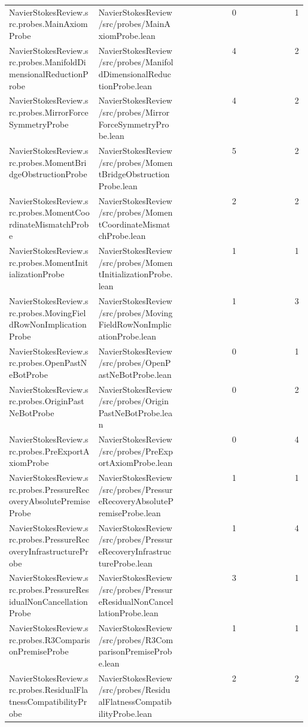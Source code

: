 \begin{longtable}{p{0.30\linewidth}p{0.28\linewidth}rr}
NavierStokesReview.src.probes.MainAxiomProbe & NavierStokesReview/src/probes/MainAxiomProbe.lean & 0 & 1\\
NavierStokesReview.src.probes.ManifoldDimensionalReductionProbe & NavierStokesReview/src/probes/ManifoldDimensionalReductionProbe.lean & 4 & 2\\
NavierStokesReview.src.probes.MirrorForceSymmetryProbe & NavierStokesReview/src/probes/MirrorForceSymmetryProbe.lean & 4 & 2\\
NavierStokesReview.src.probes.MomentBridgeObstructionProbe & NavierStokesReview/src/probes/MomentBridgeObstructionProbe.lean & 5 & 2\\
NavierStokesReview.src.probes.MomentCoordinateMismatchProbe & NavierStokesReview/src/probes/MomentCoordinateMismatchProbe.lean & 2 & 2\\
NavierStokesReview.src.probes.MomentInitializationProbe & NavierStokesReview/src/probes/MomentInitializationProbe.lean & 1 & 1\\
NavierStokesReview.src.probes.MovingFieldRowNonImplicationProbe & NavierStokesReview/src/probes/MovingFieldRowNonImplicationProbe.lean & 1 & 3\\
NavierStokesReview.src.probes.OpenPastNeBotProbe & NavierStokesReview/src/probes/OpenPastNeBotProbe.lean & 0 & 1\\
NavierStokesReview.src.probes.OriginPastNeBotProbe & NavierStokesReview/src/probes/OriginPastNeBotProbe.lean & 0 & 2\\
NavierStokesReview.src.probes.PreExportAxiomProbe & NavierStokesReview/src/probes/PreExportAxiomProbe.lean & 0 & 4\\
NavierStokesReview.src.probes.PressureRecoveryAbsolutePremiseProbe & NavierStokesReview/src/probes/PressureRecoveryAbsolutePremiseProbe.lean & 1 & 1\\
NavierStokesReview.src.probes.PressureRecoveryInfrastructureProbe & NavierStokesReview/src/probes/PressureRecoveryInfrastructureProbe.lean & 1 & 4\\
NavierStokesReview.src.probes.PressureResidualNonCancellationProbe & NavierStokesReview/src/probes/PressureResidualNonCancellationProbe.lean & 3 & 1\\
NavierStokesReview.src.probes.R3ComparisonPremiseProbe & NavierStokesReview/src/probes/R3ComparisonPremiseProbe.lean & 1 & 1\\
NavierStokesReview.src.probes.ResidualFlatnessCompatibilityProbe & NavierStokesReview/src/probes/ResidualFlatnessCompatibilityProbe.lean & 2 & 2\\

\end{longtable}
